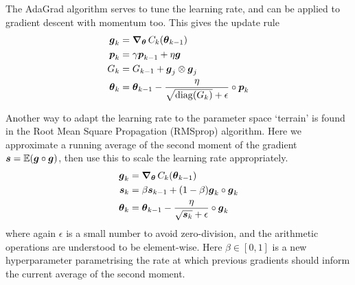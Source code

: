         The AdaGrad algorithm serves to tune the learning rate, and can be applied to gradient descent with momentum too. This gives the update rule
        \begin{subequations}
            \begin{align}
                \boldsymbol{g}_k &= \operatorname{\operatorname{\boldsymbol{\nabla}}_{\boldsymbol{\theta}}} C_k(\boldsymbol{\theta}_{k-1}) \\
                \boldsymbol{p}_k &= \gamma \boldsymbol{p}_{k-1} + \eta \boldsymbol{g} \\
                G_k &= G_{k-1} + \boldsymbol{g}_j \otimes \boldsymbol{g}_j \\
                \boldsymbol{\theta}_k &= \boldsymbol{\theta}_{k-1} - \frac{\eta}{\sqrt{\operatorname{diag}(G_k)}+\epsilon} \circ \boldsymbol{p}_k
            \end{align}
        \end{subequations}

        Another way to adapt the learning rate to the parameter space `terrain' is found in the Root Mean Square Propagation (RMSprop) algorithm. Here we approximate a running average of the second moment of the gradient $\boldsymbol{s} = \operatorname{\mathbb{E}}(\boldsymbol{g} \circ \boldsymbol{g})$, then use this to scale the learning rate appropriately.
        \begin{subequations}
            \begin{align}
                \boldsymbol{g}_k &= \operatorname{\operatorname{\boldsymbol{\nabla}}_{\boldsymbol{\theta}}} C_k(\boldsymbol{\theta}_{k-1}) \\
                \boldsymbol{s}_k &= \beta \boldsymbol{s}_{k-1} + (1-\beta) \boldsymbol{g}_k \circ \boldsymbol{g}_k \\
                \boldsymbol{\theta}_k &= \boldsymbol{\theta}_{k-1} - \frac{\eta}{\sqrt{\boldsymbol{s}_k}+\epsilon} \circ \boldsymbol{g}_k
            \end{align}
        \end{subequations}
        where again $\epsilon$ is a small number to avoid zero-division, and the arithmetic operations are understood to be element-wise. Here $\beta \in [0,1]$ is a new hyperparameter parametrising the rate at which previous gradients should inform the current average of the second moment.

